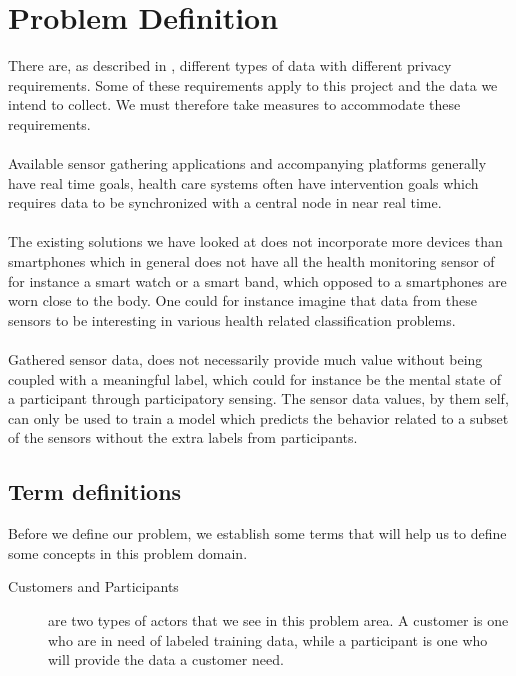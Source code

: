 
\section{Problem Definition} 
\label{sec:problem_definition}
There are, as described in , different types of data with different privacy requirements. Some of these requirements apply to this project and the data we intend to collect. We must therefore take measures to accommodate these requirements.    
\\\\
Available sensor gathering applications and accompanying platforms generally have real time goals, health care systems often have intervention goals which requires data to be synchronized with a central node in near real time. 
\\\\
The existing solutions we have looked at does not incorporate more devices than smartphones which in general does not have all the health monitoring sensor of for instance a smart watch or a smart band, which opposed to a smartphones are worn close to the body. One could for instance imagine that data from these sensors to be interesting in various health related classification problems. 
\\\\
Gathered sensor data, does not necessarily provide much value without being coupled with a meaningful label, which could for instance be the mental state of a participant through participatory sensing. The sensor data values, by them self, can only be used to train a model which predicts the behavior related to a subset of the sensors without the extra labels from participants. 

\subsection{Term definitions}
Before we define our problem, we establish some terms that will help us to define some concepts in this problem domain. 

\begin{description}
    \item [Customers and Participants] are two types of actors that we see in this problem area. A customer is one who are in need of labeled training data, while a participant is one who will provide the data a customer need. 
\end{description}

